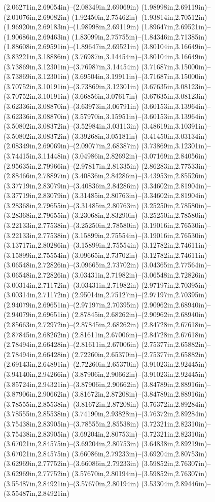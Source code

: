 (2.06271in,2.69054in)--(2.08349in,2.69069in) (1.98998in,2.69119in)--(2.01076in,2.69082in) (1.92450in,2.75462in)--(1.93814in,2.70512in) (1.96920in,2.69183in)--(1.98998in,2.69119in) (1.89647in,2.69521in)--(1.90686in,2.69463in) (1.83099in,2.75755in)--(1.84346in,2.71385in) (1.88608in,2.69591in)--(1.89647in,2.69521in) (3.80104in,3.16649in)--(3.83221in,3.18886in) (3.76987in,3.14454in)--(3.80104in,3.16649in) (3.73869in,3.12301in)--(3.76987in,3.14454in) (3.71687in,3.15000in)--(3.73869in,3.12301in) (3.69504in,3.19911in)--(3.71687in,3.15000in) (3.70752in,3.10191in)--(3.73869in,3.12301in) (3.67635in,3.08123in)--(3.70752in,3.10191in) (3.66856in,3.07617in)--(3.67635in,3.08123in) (3.62336in,3.08870in)--(3.63973in,3.06791in) (3.60153in,3.13964in)--(3.62336in,3.08870in) (3.57970in,3.15951in)--(3.60153in,3.13964in) (3.50802in,3.08372in)--(3.52984in,3.03113in) (3.48619in,3.10391in)--(3.50802in,3.08372in) (3.39268in,3.05181in)--(3.41450in,3.03134in) (2.08349in,2.69069in)--(2.09077in,2.68387in) (3.73869in,3.12301in)--(3.74415in,3.11448in) (3.04986in,2.82692in)--(3.07169in,2.84056in) (2.95635in,2.79966in)--(2.97817in,2.81335in) (2.86283in,2.77533in)--(2.88466in,2.78897in) (3.40836in,2.84286in)--(3.43953in,2.85526in) (3.37719in,2.83079in)--(3.40836in,2.84286in) (3.34602in,2.81904in)--(3.37719in,2.83079in) (3.31485in,2.80763in)--(3.34602in,2.81904in) (3.28368in,2.79655in)--(3.31485in,2.80763in) (3.25250in,2.78580in)--(3.28368in,2.79655in) (3.23068in,2.83290in)--(3.25250in,2.78580in) (3.22133in,2.77538in)--(3.25250in,2.78580in) (3.19016in,2.76530in)--(3.22133in,2.77538in) (3.15899in,2.75554in)--(3.19016in,2.76530in) (3.13717in,2.80286in)--(3.15899in,2.75554in) (3.12782in,2.74611in)--(3.15899in,2.75554in) (3.09665in,2.73702in)--(3.12782in,2.74611in) (3.06548in,2.72826in)--(3.09665in,2.73702in) (3.04365in,2.77564in)--(3.06548in,2.72826in) (3.03431in,2.71982in)--(3.06548in,2.72826in) (3.00314in,2.71172in)--(3.03431in,2.71982in) (2.97197in,2.70395in)--(3.00314in,2.71172in) (2.95014in,2.75127in)--(2.97197in,2.70395in) (2.94079in,2.69651in)--(2.97197in,2.70395in) (2.90962in,2.68940in)--(2.94079in,2.69651in) (2.87845in,2.68262in)--(2.90962in,2.68940in) (2.85663in,2.72972in)--(2.87845in,2.68262in) (2.84728in,2.67618in)--(2.87845in,2.68262in) (2.81611in,2.67006in)--(2.84728in,2.67618in) (2.78494in,2.66428in)--(2.81611in,2.67006in) (2.75377in,2.65882in)--(2.78494in,2.66428in) (2.72260in,2.65370in)--(2.75377in,2.65882in) (2.69143in,2.64891in)--(2.72260in,2.65370in) (3.91023in,2.92445in)--(3.94140in,2.94266in) (3.87906in,2.90662in)--(3.91023in,2.92445in) (3.85724in,2.94321in)--(3.87906in,2.90662in) (3.84789in,2.88916in)--(3.87906in,2.90662in) (3.81672in,2.87208in)--(3.84789in,2.88916in) (3.78555in,2.85538in)--(3.81672in,2.87208in) (3.76372in,2.89284in)--(3.78555in,2.85538in) (3.74190in,2.93828in)--(3.76372in,2.89284in) (3.75438in,2.83905in)--(3.78555in,2.85538in) (3.72321in,2.82310in)--(3.75438in,2.83905in) (3.69204in,2.80753in)--(3.72321in,2.82310in) (3.67021in,2.84575in)--(3.69204in,2.80753in) (3.64838in,2.89219in)--(3.67021in,2.84575in) (3.66086in,2.79233in)--(3.69204in,2.80753in) (3.62969in,2.77752in)--(3.66086in,2.79233in) (3.59852in,2.76307in)--(3.62969in,2.77752in) (3.57670in,2.80194in)--(3.59852in,2.76307in) (3.55487in,2.84921in)--(3.57670in,2.80194in) (3.53304in,2.89446in)--(3.55487in,2.84921in) 